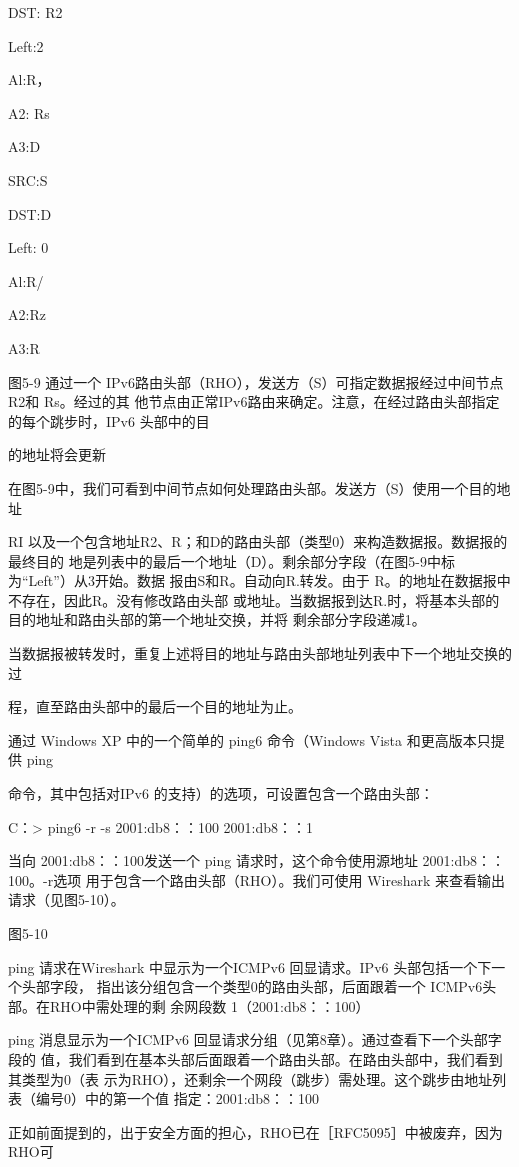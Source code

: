 DST: R2

Left:2

Al:R，

A2: Rs

A3:D

SRC:S

DST:D

Left: 0

Al:R/

A2:Rz

A3:R

图5-9 通过一个 IPv6路由头部（RHO），发送方（S）可指定数据报经过中间节点 R2和 Rs。经过的其
他节点由正常IPv6路由来确定。注意，在经过路由头部指定的每个跳步时，IPv6 头部中的目

的地址将会更新

在图5-9中，我们可看到中间节点如何处理路由头部。发送方（S）使用一个目的地址

RI 以及一个包含地址R2、R；和D的路由头部（类型0）来构造数据报。数据报的最终目的
地是列表中的最后一个地址（D）。剩余部分字段（在图5-9中标为“Left”）从3开始。数据
报由S和R。自动向R.转发。由于 R。的地址在数据报中不存在，因此R。没有修改路由头部
或地址。当数据报到达R.时，将基本头部的目的地址和路由头部的第一个地址交换，并将
剩余部分字段递减1。

当数据报被转发时，重复上述将目的地址与路由头部地址列表中下一个地址交换的过

程，直至路由头部中的最后一个目的地址为止。

通过 Windows XP 中的一个简单的 ping6 命令（Windows Vista 和更高版本只提供 ping

命令，其中包括对IPv6 的支持）的选项，可设置包含一个路由头部：

C：> ping6 -r -s 2001:db8：：100 2001:db8：：1

当向 2001:db8：：100发送一个 ping 请求时，这个命令使用源地址 2001:db8：：100。-r选项
用于包含一个路由头部（RHO）。我们可使用 Wireshark 来查看输出请求（见图5-10）。

图5-10

ping 请求在Wireshark 中显示为一个ICMPv6 回显请求。IPv6 头部包括一个下一个头部字段，
指出该分组包含一个类型0的路由头部，后面跟着一个 ICMPv6头部。在RHO中需处理的剩
余网段数 1（2001:db8：：100）

ping 消息显示为一个ICMPv6 回显请求分组（见第8章）。通过查看下一个头部字段的
值，我们看到在基本头部后面跟着一个路由头部。在路由头部中，我们看到其类型为0（表
示为RHO），还剩余一个网段（跳步）需处理。这个跳步由地址列表（编号0）中的第一个值
指定：2001:db8：：100

正如前面提到的，出于安全方面的担心，RHO已在［RFC5095］中被废弃，因为RHO可

